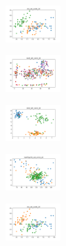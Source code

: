 \vspace*{\fill}
\newpage
\vspace*{\fill}

\begin{figure}[H]    
    \centering
    \begin{subfigure}
        \centering
        \includegraphics[width=0.234\textwidth]{img/agesf/iris_set_const_20_949004259_clust.png}
    \end{subfigure}
    \hfill
    \begin{subfigure}
        \centering
        \includegraphics[width=0.234\textwidth]{img/agesf/ecoli_set_const_20_949004259_clust.png}
    \end{subfigure}
    \hfill
    \begin{subfigure}
        \centering
        \includegraphics[width=0.234\textwidth]{img/agesf/rand_set_const_20_949004259_clust.png}
    \end{subfigure}
    \hfill
    \begin{subfigure}
        \centering
        \includegraphics[width=0.234\textwidth]{img/agesf/newthyroid_set_const_20_949004259_clust.png}
    \end{subfigure}
    \hfill
    \begin{subfigure}
        \centering
        \includegraphics[width=0.234\textwidth]{img/agesf/iris_set_const_20_589741062_clust.png}

\end{subfigure}
\end{figure}
